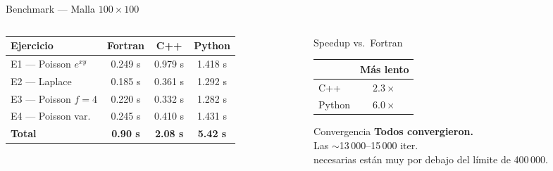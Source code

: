 \documentclass[aspectratio=169, 11pt]{beamer}
\begin{document}
\begin{frame}{Benchmark — Malla $100\times100$}
  \begin{columns}[T]
    \begin{column}{0.55\textwidth}
      \begin{center}
      \begin{tabular}{lccc}
        \toprule
        \textbf{Ejercicio} & \textbf{Fortran} & \textbf{C++} & \textbf{Python} \\
        \midrule
        E1 — Poisson $e^{xy}$ & 0.249 s & 0.979 s & 1.418 s \\
        E2 — Laplace          & 0.185 s & 0.361 s & 1.292 s \\
        E3 — Poisson $f=4$    & 0.220 s & 0.332 s & 1.282 s \\
        E4 — Poisson var.     & 0.245 s & 0.410 s & 1.431 s \\
        \midrule
        \rowcolor{azulfc!12}
        \textbf{Total} & \textbf{0.90 s} & \textbf{2.08 s} & \textbf{5.42 s} \\
        \bottomrule
      \end{tabular}
      \end{center}
    \end{column}
    \begin{column}{0.42\textwidth}
      \begin{block}{Speedup vs.\ Fortran}
        \begin{tabular}{lc}
          \toprule
          & Más lento \\
          \midrule
          C++    & $2.3\times$ \\
          Python & $6.0\times$ \\
          \bottomrule
        \end{tabular}
      \end{block}
      \vspace{0.3cm}
      \begin{exampleblock}{Convergencia}
        \textbf{Todos convergieron.}\\
        Las $\sim$13\,000–15\,000 iter.\\ necesarias están muy por debajo del límite de 400\,000.
      \end{exampleblock}
    \end{column}
  \end{columns}
\end{frame}
\end{document}
